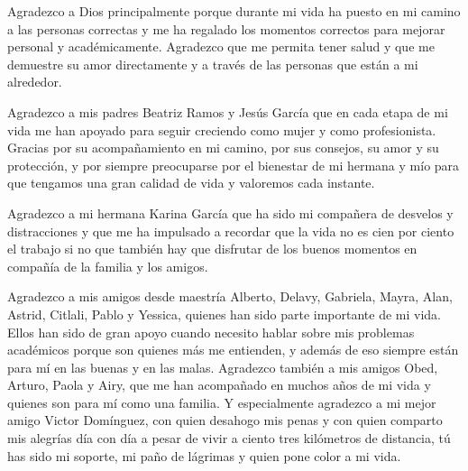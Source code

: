


Agradezco a Dios principalmente porque durante mi vida ha puesto en mi camino a las personas correctas y me ha regalado los momentos correctos para mejorar personal y académicamente. Agradezco que me permita tener salud y que me demuestre su amor directamente y a través de las personas que están a mi alrededor. 

Agradezco a mis padres Beatriz Ramos y Jesús García que en cada etapa de mi vida me han apoyado para seguir creciendo como mujer y como profesionista. Gracias por su acompañamiento en mi camino, por sus consejos, su amor y su protección, y por siempre preocuparse por el bienestar de mi hermana y mío para que tengamos una gran calidad de vida y valoremos cada instante. 

Agradezco a mi hermana Karina García que ha sido mi compañera de desvelos y distracciones y que me ha impulsado a recordar que la vida no es cien por ciento el trabajo si no que también hay que disfrutar de los buenos momentos en compañía de la familia y los amigos.

Agradezco a mis amigos desde maestría Alberto, Delavy, Gabriela, Mayra, Alan, Astrid, Citlali, Pablo y Yessica, quienes han sido parte importante de mi vida. Ellos han sido de gran apoyo cuando necesito hablar sobre mis problemas académicos porque son quienes más me entienden, y además de eso siempre están para mí en las buenas y en las malas. Agradezco también a mis amigos Obed, Arturo, Paola y Airy, que me han acompañado en muchos años de mi vida y quienes son para mí como una familia. Y especialmente agradezco a mi mejor amigo Victor Domínguez, con quien desahogo mis penas y con quien comparto mis alegrías día con día a pesar de vivir a ciento tres kilómetros de distancia, tú has sido mi soporte, mi paño de lágrimas y quien pone color a mi vida.

